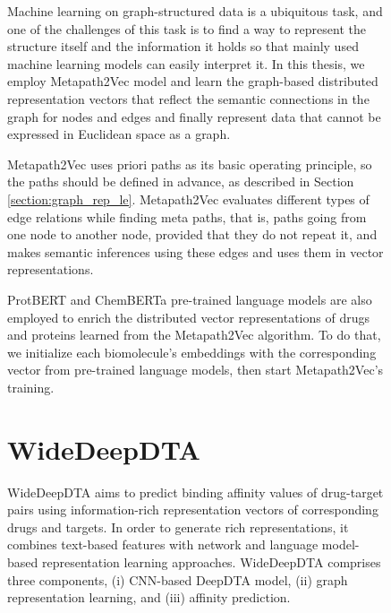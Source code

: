 \begin{figure}[h]

Machine learning on graph-structured data is a ubiquitous task, and one of the challenges of this task is to find a way to represent the structure itself and the information it holds so that mainly used machine learning models can easily interpret it. In this thesis, we employ Metapath2Vec \cite{dong2017metapath2vec} model and learn the graph-based distributed representation vectors that reflect the semantic connections in the graph for nodes and edges and finally represent data that cannot be expressed in Euclidean space as a graph.

Metapath2Vec uses priori paths as its basic operating principle, so the paths should be defined in advance, as described in Section \ref{section:graph_rep_le}. Metapath2Vec evaluates different types of edge relations while finding meta paths, that is, paths going from one node to another node, provided that they do not repeat it, and makes semantic inferences using these edges and uses them in vector representations.

ProtBERT and ChemBERTa pre-trained language models are also employed to enrich the distributed vector representations of drugs and proteins learned from the Metapath2Vec algorithm. To do that, we initialize each biomolecule's embeddings with the corresponding vector from pre-trained language models, then start Metapath2Vec's training.

\section{WideDeepDTA}
WideDeepDTA aims to predict binding affinity values of drug-target pairs using information-rich representation vectors of corresponding drugs and targets. In order to generate rich representations, it combines text-based features with network and language model-based representation learning approaches. WideDeepDTA comprises three components, (i) CNN-based DeepDTA model, (ii) graph representation learning, and (iii) affinity prediction.



\end{figure}
